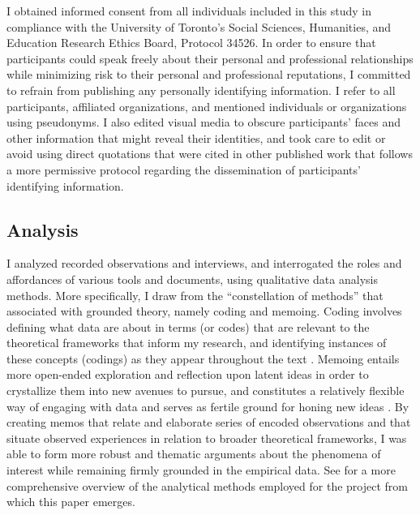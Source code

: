 \documentclass{article}
\begin{document}
I obtained informed consent from all individuals included in this study
in compliance with the University of Toronto's Social Sciences,
Humanities, and Education Research Ethics Board, Protocol 34526. In
order to ensure that participants could speak freely about their
personal and professional relationships while minimizing risk to their
personal and professional reputations, I committed to refrain from
publishing any personally identifying information. I refer to all
participants, affiliated organizations, and mentioned individuals or
organizations using pseudonyms. I also edited visual media to obscure
participants' faces and other information that might reveal their
identities, and took care to edit or avoid using direct quotations that
were cited in other published work that follows a more permissive
protocol regarding the dissemination of participants' identifying
information.

\subsection{Analysis}

I analyzed recorded observations and interviews, and interrogated the
roles and affordances of various tools and documents, using qualitative
data analysis methods. More specifically, I draw from the
``constellation of methods'' that \textcite[14-15]{charmaz2014}
associated with grounded theory, namely coding and memoing. Coding
involves defining what data are about in terms (or codes) that are
relevant to the theoretical frameworks that inform my research, and
identifying instances of these concepts (codings) as they appear
throughout the text \parencite[43]{charmaz2014}. Memoing entails more
open-ended exploration and reflection upon latent ideas in order to
crystallize them into new avenues to pursue, and constitutes a
relatively flexible way of engaging with data and serves as fertile
ground for honing new ideas \parencite[72]{charmaz2014}. By creating
memos that relate and elaborate series of encoded observations and that
situate observed experiences in relation to broader theoretical
frameworks, I was able to form more robust and thematic arguments about
the phenomena of interest while remaining firmly grounded in the
empirical data. See \textcite[9-10]{batist2024a} for a more
comprehensive overview of the analytical methods employed for the
project from which this paper emerges.
\end{document}
